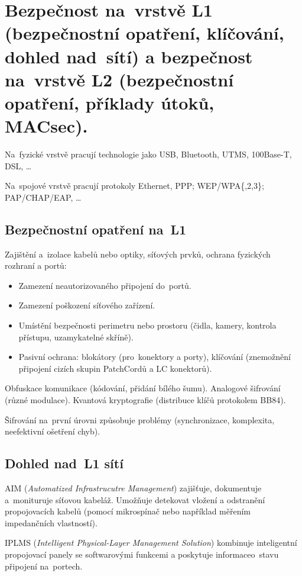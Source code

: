 \section{Bezpečnost na~vrstvě L1 (bezpečnostní opatření, klíčování, dohled nad~sítí) a bezpečnost na~vrstvě L2 (bezpečnostní opatření, příklady útoků, MACsec).}

Na~fyzické vrstvě pracují technologie jako USB, Bluetooth, UTMS, 100Base-T, DSL, \dots

Na~spojové vrstvě pracují protokoly Ethernet, PPP; WEP/WPA\{,2,3\}; PAP/CHAP/EAP, \dots


\subsection{Bezpečnostní opatření na~L1}

Zajištění a~izolace kabelů nebo optiky, síťových prvků, ochrana fyzických rozhraní a portů:
\begin{itemize}
	\item Zamezení neautorizovaného připojení do~portů.
	\item Zamezení poškození síťového zařízení.
	\item Umístění bezpečnosti perimetru nebo prostoru (čidla, kamery, kontrola přístupu, uzamykatelné skříně).
	\item Pasivní ochrana: blokátory (pro~konektory a porty), klíčování (znemožnění připojení cizích skupin PatchCordů a LC konektorů).
\end{itemize}

Obfuskace komunikace (kódování, přidání bílého šumu).
Analogové šifrování (různé modulace).
Kvantová kryptografie (distribuce klíčů protokolem BB84).

Šifrování na~první úrovni způsobuje problémy (synchronizace, komplexita, neefektivní ošetření chyb).


\subsection{Dohled nad~L1 sítí}

AIM (\emph{Automatized Infrastrucutre Management}) zajišťuje, dokumentuje a~monituruje síťovou kabeláž.
Umožňuje detekovat vložení a odstranění propojovacích kabelů (pomocí mikrospínač nebo například měřením impedančních vlastností).

IPLMS (\emph{Intelligent Physical-Layer Management Solution}) kombinuje inteligentní propojovací panely se softwarovými funkcemi a poskytuje informaceo~stavu připojení na~portech.


